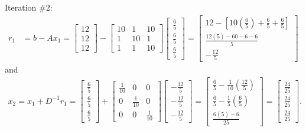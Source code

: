 \documentclass[12pt]{article}
\begin{document}
Iteration \#2:
\begin{align*}
    r_1 &= b - Ax_1
    = 
    \begin{bmatrix}
        12 \\[1.5ex]
        12 \\[1.5ex]
        12
    \end{bmatrix} - 
        \begin{bmatrix}
            10  & 1 & 10 \\[1.5ex]
            1  & 10 & 1 \\[1.5ex]
            1  & 1 & 10
        \end{bmatrix}
        \begin{bmatrix} \frac{6}{5} \\[1.5ex] \frac{6}{5} \\[1.5ex] \frac{6}{5} \end{bmatrix}
    =
    \begin{bmatrix}
        12 - [10(\frac{6}{5}) + \frac{6}{5} + \frac{6}{5}] \\[1.5ex]
        \frac{12(5) - 60 - 6 - 6}{5} \\[1.5ex]
        -\frac{12}{5}
    \end{bmatrix}
\end{align*}
and
\begin{align*}
    x_2 = x_1 + D^{-1}r_1 
    =
    \begin{bmatrix} \frac{6}{5} \\[1.5ex] \frac{6}{5} \\[1.5ex] \frac{6}{5} \end{bmatrix} + 
        \begin{bmatrix}
            \frac{1}{10}  & 0 & 0 \\[1.5ex]
            0  & \frac{1}{10} & 0 \\[1.5ex]
            0  & 0 & \frac{1}{10}
        \end{bmatrix}
        \begin{bmatrix} -\frac{12}{5} \\[1.5ex] -\frac{12}{5} \\[1.5ex] -\frac{12}{5}
    \end{bmatrix}
    =
    \begin{bmatrix}
        \frac{6}{5} - \frac{1}{10}(\frac{12}{5}) \\[1.5ex]
        \frac{6}{5} - \frac{1}{5}(\frac{6}{5}) \\[1.5ex]
        \frac{6(5)-6}{25}
    \end{bmatrix}
    =
    \begin{bmatrix}
        \frac{24}{25} \\[1.5ex]
        \frac{24}{25} \\[1.5ex]
        \frac{24}{25}
    \end{bmatrix}.
\end{align*}
\end{document}
